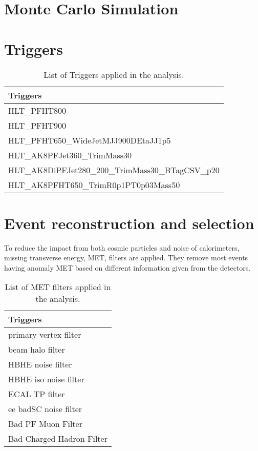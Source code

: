 \section{Monte Carlo Simulation} \label{Monte Carlo Simulation}	

\section{Triggers} \label{Triggers}
\begin{table}[h!]
  \begin{center}
    \begin{tabular}{l}
    Triggers \\
    \hline
    HLT_PFHT800 \\
    HLT_PFHT900 \\
    HLT_PFHT650_WideJetMJJ900DEtaJJ1p5 \\
    HLT_AK8PFJet360_TrimMass30 \\
    HLT_AK8DiPFJet280_200_TrimMass30_BTagCSV_p20 \\
    HLT_AK8PFHT650_TrimR0p1PT0p03Mass50 \\
    \hline
    \end{tabular}
  \end{center}

  \caption{List of Triggers applied in the analysis.}
\end{table} 


\section{Event reconstruction and selection} \label{Event reconstruction and selection}
To reduce the impact from both cosmic particles and noise of calorimeters, missing transverse energy, MET, filters are applied. 
They remove most events having anomaly MET based on different information given from the detectors.
\begin{table}[h!]
  \begin{center}
    \begin{tabular}{l}
    Triggers \\
    \hline
    primary vertex filter \\
    beam halo filter \\
    HBHE noise filter \\
    HBHE iso noise filter \\
    ECAL TP filter \\
    ee badSC noise filter \\
	Bad PF Muon Filter \\
	Bad Charged Hadron Filter \\ 
    \hline
    \end{tabular}
  \end{center}

  \caption{List of MET filters applied in the analysis.}
\end{table}
 
